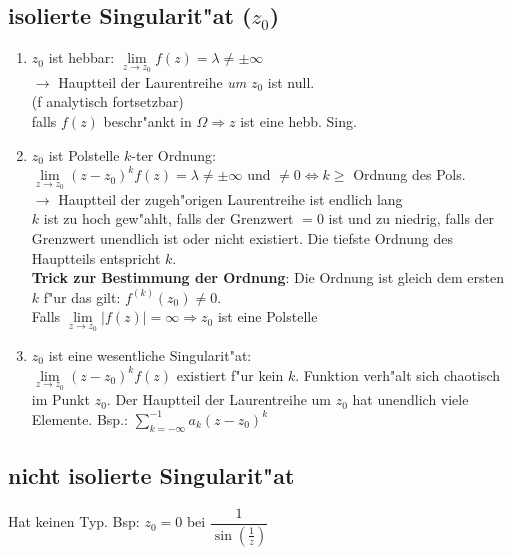 \subsection{isolierte Singularit"at (\(z_0\))}
\begin{enumerate}
	\item	\(z_0\) ist hebbar: \( \lim\limits_{z \to z_0} f(z) = \lambda \neq \pm \infty \)\\
	\(\to\) Hauptteil der Laurentreihe \emph{um} \(z_0\) ist null.\\
	(f analytisch fortsetzbar)\\
	falls $f(z)$ beschr"ankt in $\Omega \Rightarrow z$ ist eine hebb. Sing.
	\item	\(z_0\) ist Polstelle \(k\)-ter Ordnung:\\
	\( \lim\limits_{z \to z_0} (z-z_0)^k f(z) = \lambda \neq \pm \infty \text{ und } \neq 0
	\Longleftrightarrow k \geq \) Ordnung des Pols.\\
	\( \to \) Hauptteil der zugeh"origen Laurentreihe ist endlich lang\\
	\(k\) ist zu hoch gew"ahlt, falls der Grenzwert \(= 0\) ist und zu niedrig, falls der Grenzwert unendlich ist
	oder nicht existiert. Die tiefste Ordnung des Hauptteils entspricht \(k\).\\
	\textbf{Trick zur Bestimmung der Ordnung}: Die Ordnung ist gleich dem ersten \(k\) f"ur das gilt:
	\(f^{(k)}(z_0) \neq 0\).\\
	Falls $\lim\limits_{z \rightarrow z_0} |f(z)| = \infty \Rightarrow z_0$ ist eine Polstelle
	\item	\(z_0\) ist eine wesentliche Singularit"at:\\
	\( \lim\limits_{z \to z_0} (z-z_0)^k f(z)\) existiert f"ur kein \(k\). Funktion verh"alt sich chaotisch im Punkt \(z_0\).
	Der Hauptteil der Laurentreihe um \(z_0\) hat unendlich viele Elemente. Bsp.: \(\sum_{k=-\infty}^{-1} a_k (z-z_0)^k\)
\end{enumerate}

\subsection{nicht isolierte Singularit"at}
Hat keinen Typ. Bsp: \(z_0 = 0\) bei \(\dfrac{1}{\sin(\frac{1}{z})}\)
